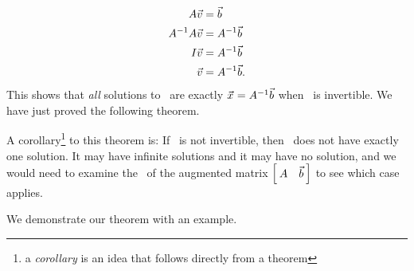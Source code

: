 \begin{align*} \tta\vv &=\vb \\ \ttai\tta\vv &=\ttai\vb \\ \tti\vv &= \ttai\vb \\ \vv &= \ttai\vb. \end{align*} This shows that \textit{all} solutions to \ttaxb\ are exactly $\vx = \ttai\vb$ when \tta\ is invertible. We have just proved the following theorem.


A corollary\footnote{a \textit{corollary} is an idea that follows directly from a theorem} to this theorem is: If \tta\ is not invertible, then \ttaxb\ does not have exactly one solution. It may have infinite solutions and it may have no solution, and we would need to examine the \rref\ of the augmented matrix $\bmx{cc} \tta & \vb \emx$ to see which case applies.

We demonstrate our theorem with an example.\\

